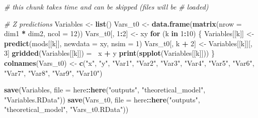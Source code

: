 \documentclass[
]{article}
\newenvironment{Shaded}{\begin{snugshade}}{\end{snugshade}}
\newcommand{\CommentTok}[1]{\textcolor[rgb]{0.56,0.35,0.01}{\textit{#1}}}
\newcommand{\ControlFlowTok}[1]{\textcolor[rgb]{0.13,0.29,0.53}{\textbf{#1}}}
\newcommand{\DataTypeTok}[1]{\textcolor[rgb]{0.13,0.29,0.53}{#1}}
\newcommand{\DecValTok}[1]{\textcolor[rgb]{0.00,0.00,0.81}{#1}}
\newcommand{\ErrorTok}[1]{\textcolor[rgb]{0.64,0.00,0.00}{\textbf{#1}}}
\newcommand{\KeywordTok}[1]{\textcolor[rgb]{0.13,0.29,0.53}{\textbf{#1}}}
\newcommand{\NormalTok}[1]{#1}
\newcommand{\OperatorTok}[1]{\textcolor[rgb]{0.81,0.36,0.00}{\textbf{#1}}}
\newcommand{\StringTok}[1]{\textcolor[rgb]{0.31,0.60,0.02}{#1}}
\begin{document}
\begin{Shaded}
\begin{Highlighting}[]
\CommentTok{# this chunk takes time and can be skipped (files will be}
\CommentTok{# loaded)}

\CommentTok{# Z predictions}
\NormalTok{Variables <-}\StringTok{ }\KeywordTok{list}\NormalTok{()}
\NormalTok{Vars_t0 <-}\StringTok{ }\KeywordTok{data.frame}\NormalTok{(}\KeywordTok{matrix}\NormalTok{(}\DataTypeTok{nrow =}\NormalTok{ dim1 }\OperatorTok{*}\StringTok{ }\NormalTok{dim2, }\DataTypeTok{ncol =} \DecValTok{12}\NormalTok{))}
\NormalTok{Vars_t0[, }\DecValTok{1}\OperatorTok{:}\DecValTok{2}\NormalTok{] <-}\StringTok{ }\NormalTok{xy}
\ControlFlowTok{for}\NormalTok{ (k }\ControlFlowTok{in} \DecValTok{1}\OperatorTok{:}\DecValTok{10}\NormalTok{) \{}
\NormalTok{    Variables[[k]] <-}\StringTok{ }\KeywordTok{predict}\NormalTok{(mods[[k]], }\DataTypeTok{newdata =}\NormalTok{ xy, }\DataTypeTok{nsim =} \DecValTok{1}\NormalTok{)}
\NormalTok{    Vars_t0[, k }\OperatorTok{+}\StringTok{ }\DecValTok{2}\NormalTok{] <-}\StringTok{ }\NormalTok{Variables[[k]][, }\DecValTok{3}\NormalTok{]}
    \KeywordTok{gridded}\NormalTok{(Variables[[k]]) =}\StringTok{ }\ErrorTok{~}\NormalTok{x }\OperatorTok{+}\StringTok{ }\NormalTok{y}
    \KeywordTok{print}\NormalTok{(}\KeywordTok{spplot}\NormalTok{(Variables[[k]]))}
\NormalTok{\}}
\KeywordTok{colnames}\NormalTok{(Vars_t0) <-}\StringTok{ }\KeywordTok{c}\NormalTok{(}\StringTok{"x"}\NormalTok{, }\StringTok{"y"}\NormalTok{, }\StringTok{"Var1"}\NormalTok{, }\StringTok{"Var2"}\NormalTok{, }\StringTok{"Var3"}\NormalTok{, }\StringTok{"Var4"}\NormalTok{, }
    \StringTok{"Var5"}\NormalTok{, }\StringTok{"Var6"}\NormalTok{, }\StringTok{"Var7"}\NormalTok{, }\StringTok{"Var8"}\NormalTok{, }\StringTok{"Var9"}\NormalTok{, }\StringTok{"Var10"}\NormalTok{)}

\KeywordTok{save}\NormalTok{(Variables, }\DataTypeTok{file =}\NormalTok{ here}\OperatorTok{::}\KeywordTok{here}\NormalTok{(}\StringTok{"outputs"}\NormalTok{, }\StringTok{"theoretical_model"}\NormalTok{, }
    \StringTok{"Variables.RData"}\NormalTok{))}
\KeywordTok{save}\NormalTok{(Vars_t0, }\DataTypeTok{file =}\NormalTok{ here}\OperatorTok{::}\KeywordTok{here}\NormalTok{(}\StringTok{"outputs"}\NormalTok{, }\StringTok{"theoretical_model"}\NormalTok{, }
    \StringTok{"Vars_t0.RData"}\NormalTok{))}
\end{Highlighting}
\end{Shaded}
\end{document}
